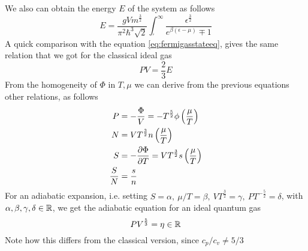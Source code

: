 \documentclass[../qm.tex]{subfiles}
\begin{document}
	We also can obtain the energy $E$ of the system as follows
	\begin{equation}
		E=\frac{gVm^{\frac{3}{2}}}{\pi^2\hbar^3\sqrt{2}}\int_{'}^{\infty}\frac{\epsilon^{\frac{3}{2}}}{e^{\beta(\epsilon-\mu)}\mp1}
		\label{eq:energyfermigas}
	\end{equation}
	A quick comparison with the equation \eqref{eq:fermigasstateeq}, gives the same relation that we got for the classical ideal gas
	\begin{equation}
		PV=\frac{2}{3}E
		\label{eq:fermigasrelation}
	\end{equation}
	From the homogeneity of $\Phi$ in $T,\mu$ we can derive from the previous equations other relations, as follows
	\begin{equation}
		\begin{aligned}
			P&=-\frac{\Phi}{V}=-T^{\frac{5}{2}}\phi\left( \frac{\mu}{T} \right)\\
			N&=VT^{\frac{3}{2}}n\left( \frac{\mu}{T} \right)\\
			S&=-\pdv{\Phi}{T}=VT^{\frac{3}{2}}s\left( \frac{\mu}{T} \right)\\
			\frac{S}{N}&=\frac{s}{n}
		\end{aligned}
		\label{eq:additionalrelationsfermigas}
	\end{equation}
	For an adiabatic expansion, i.e. setting $S=\alpha,\ \mu/T=\beta,\ VT^{\frac{3}{2}}=\gamma,\ PT^{-\frac{5}{2}}=\delta$, with $\alpha,\beta,\gamma,\delta\in\mathbb{R}$, we get the adiabatic equation for an ideal quantum gas
	\begin{equation}
		PV^{\frac{5}{3}}=\eta\in\mathbb{R}
		\label{eq:adiabaticequationidealqg}
	\end{equation}
	Note how this differs from the classical version, since $c_p/c_v\ne5/3$
\end{document}
